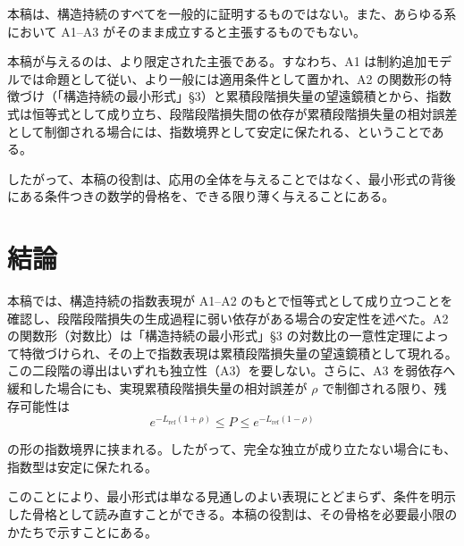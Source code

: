 \documentclass[12pt,a4paper]{article}
\begin{document}
本稿は、構造持続のすべてを一般的に証明するものではない。また、あらゆる系において A1--A3 がそのまま成立すると主張するものでもない。

本稿が与えるのは、より限定された主張である。すなわち、A1 は制約追加モデルでは命題として従い、より一般には適用条件として置かれ、A2 の関数形の特徴づけ（「構造持続の最小形式」§3）と累積段階損失量の望遠鏡積とから、指数式は恒等式として成り立ち、段階段階損失間の依存が累積段階損失量の相対誤差として制御される場合には、指数境界として安定に保たれる、ということである。

したがって、本稿の役割は、応用の全体を与えることではなく、最小形式の背後にある条件つきの数学的骨格を、できる限り薄く与えることにある。

\section{結論}\label{ux7d50ux8ad6}

本稿では、構造持続の指数表現が A1--A2 のもとで恒等式として成り立つことを確認し、段階段階損失の生成過程に弱い依存がある場合の安定性を述べた。A2 の関数形（対数比）は「構造持続の最小形式」§3 の対数比の一意性定理によって特徴づけられ、その上で指数表現は累積段階損失量の望遠鏡積として現れる。この二段階の導出はいずれも独立性（A3）を要しない。さらに、A3 を弱依存へ緩和した場合にも、実現累積段階損失量の相対誤差が \(\rho\) で制御される限り、残存可能性は \[
e^{-L_{\text{ref}}(1+\rho)} \le P \le e^{-L_{\text{ref}}(1-\rho)}
\]

の形の指数境界に挟まれる。したがって、完全な独立が成り立たない場合にも、指数型は安定に保たれる。

このことにより、最小形式は単なる見通しのよい表現にとどまらず、条件を明示した骨格として読み直すことができる。本稿の役割は、その骨格を必要最小限のかたちで示すことにある。
\end{document}
